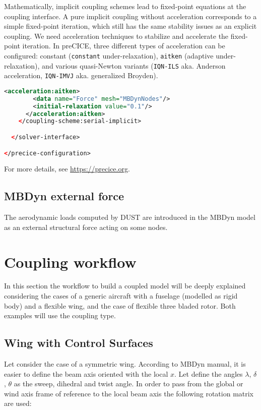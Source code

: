Mathematically, implicit coupling schemes lead to fixed-point 
equations at the coupling interface. A pure implicit coupling 
without acceleration corresponds to a simple fixed-point iteration, 
which still has the same stability issues as an explicit coupling. 
We need acceleration techniques to stabilize and accelerate the fixed-point iteration. 
In preCICE, three different types of acceleration can be configured: 
constant (\texttt{constant} under-relaxation), 
\texttt{aitken} (adaptive under-relaxation), 
and various quasi-Newton variants (\texttt{IQN-ILS} aka. 
Anderson acceleration, \texttt{IQN-IMVJ} aka. generalized Broyden).
\begin{lstlisting}[language=XML]
      <acceleration:aitken>
        <data name="Force" mesh="MBDynNodes"/>
        <initial-relaxation value="0.1"/>
      </acceleration:aitken>		
    </coupling-scheme:serial-implicit>

  </solver-interface>

</precice-configuration>
\end{lstlisting}

For more details, see \url{https://precice.org}.
\subsection{MBDyn external force}
The aerodynamic loads computed by DUST are introduced in the MBDyn model as an external structural force acting on some nodes.

\section{Coupling workflow}
In this section the workflow to build a coupled model will be deeply explained considering the cases of a generic aircraft with a fuselage (modelled as rigid body) and a flexible wing, and the case of flexible three bladed rotor. 
Both examples will use the  coupling type. 

\subsection{Wing with Control Surfaces}
Let consider the case of a symmetric wing. According to MBDyn manual, 
it is easier to define the beam axis oriented with the local $x$. 
Let define the angles $\lambda$, $\delta$, $\theta$ as the sweep, 
dihedral and twist angle. In order to pass from the global or wind 
axis frame of reference to the local beam axis the following rotation matrix are used: 

